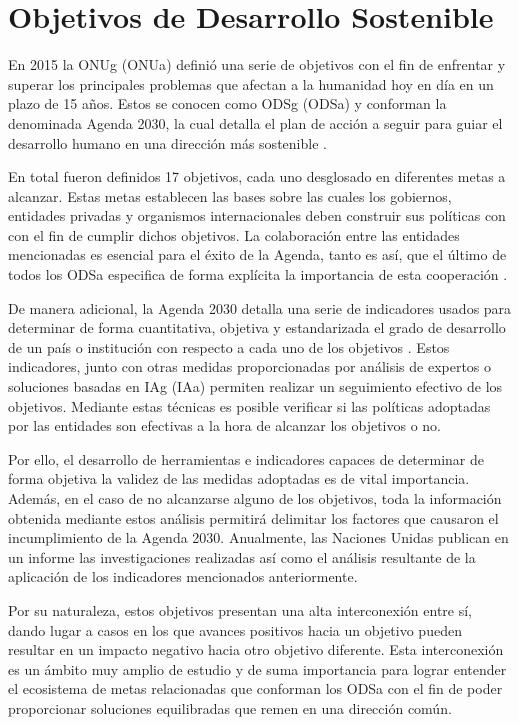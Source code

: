 \section{Objetivos de Desarrollo Sostenible}

En 2015 la \gls{ONUg} (\gls{ONUa}) definió una serie de
objetivos con el fin de enfrentar y superar los principales problemas que
afectan a la humanidad hoy en día en un plazo de 15 años. Estos se conocen como
\gls{ODSg} (\gls{ODSa}) y conforman la denominada Agenda 2030,
la cual detalla el plan de acción a seguir para guiar el desarrollo humano en una
dirección más sostenible \cite{Agenda2023}.

En total fueron definidos 17 objetivos, cada uno desglosado en diferentes metas
a alcanzar. Estas metas establecen las bases sobre las cuales los gobiernos,
entidades privadas y organismos internacionales deben construir sus políticas
con con el fin de cumplir dichos objetivos. La colaboración entre las entidades
mencionadas es esencial para el éxito de la Agenda, tanto es así, que el último
de todos los \gls{ODSa} especifica de forma explícita la importancia de esta
cooperación \cite{JointSDGFund}.

De manera adicional, la Agenda 2030 detalla una serie de indicadores usados para
determinar de forma cuantitativa, objetiva y estandarizada el grado de
desarrollo de un país o institución con respecto a cada uno de los
objetivos \cite{UNSDGs}. Estos indicadores, junto con otras medidas proporcionadas por
análisis de expertos o soluciones basadas en \gls{IAg} (\gls{IAa})
permiten realizar un seguimiento efectivo de los objetivos. Mediante estas
técnicas es posible verificar si las políticas adoptadas por las entidades son
efectivas a la hora de alcanzar los objetivos o no.

Por ello, el desarrollo de herramientas e indicadores capaces de determinar de
forma objetiva la validez de las medidas adoptadas es de vital importancia.
Además, en el caso de no alcanzarse alguno de los objetivos, toda la información
obtenida mediante estos análisis permitirá delimitar los factores que causaron
el incumplimiento de la Agenda 2030. Anualmente, las Naciones Unidas publican en
un informe las investigaciones realizadas así como el análisis resultante de la
aplicación de los indicadores mencionados
anteriormente.\cite{UNSDGProgressReport}

Por su naturaleza, estos objetivos presentan una alta interconexión entre sí,
dando lugar a casos en los que avances positivos hacia un objetivo pueden
resultar en un impacto negativo hacia otro objetivo diferente. Esta
interconexión es un ámbito muy amplio de estudio y de suma importancia para
lograr entender el ecosistema de metas relacionadas que conforman los \gls{ODSa}
con el fin de poder proporcionar soluciones equilibradas que remen en una
dirección común.

